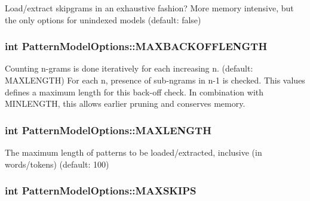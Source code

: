 Load/extract skipgrams in an exhaustive fashion? More memory intensive, but the only options for unindexed models (default\+: false) 

\hypertarget{classPatternModelOptions_a9154b55890ee1ff5d9ec43741a0e3908}{}
\subsubsection[{M\+A\+X\+B\+A\+C\+K\+O\+F\+F\+L\+E\+N\+G\+T\+H}]{\setlength{\rightskip}{0pt plus 5cm}int Pattern\+Model\+Options\+::\+M\+A\+X\+B\+A\+C\+K\+O\+F\+F\+L\+E\+N\+G\+T\+H}\label{classPatternModelOptions_a9154b55890ee1ff5d9ec43741a0e3908}
Counting n-\/grams is done iteratively for each increasing n. (default\+: M\+A\+X\+L\+E\+N\+G\+T\+H) For each n, presence of sub-\/ngrams in n-\/1 is checked. This values defines a maximum length for this back-\/off check. In combination with M\+I\+N\+L\+E\+N\+G\+T\+H, this allows earlier pruning and conserves memory. \hypertarget{classPatternModelOptions_a7630da974c460ec2d67c2ed9f4c84144}{}
\subsubsection[{M\+A\+X\+L\+E\+N\+G\+T\+H}]{\setlength{\rightskip}{0pt plus 5cm}int Pattern\+Model\+Options\+::\+M\+A\+X\+L\+E\+N\+G\+T\+H}\label{classPatternModelOptions_a7630da974c460ec2d67c2ed9f4c84144}


The maximum length of patterns to be loaded/extracted, inclusive (in words/tokens) (default\+: 100) 

\hypertarget{classPatternModelOptions_a03fe79b560a2e9b598f607912e43b295}{}
\subsubsection[{M\+A\+X\+S\+K\+I\+P\+S}]{\setlength{\rightskip}{0pt plus 5cm}int Pattern\+Model\+Options\+::\+M\+A\+X\+S\+K\+I\+P\+S}\label{classPatternModelOptions_a03fe79b560a2e9b598f607912e43b295}


